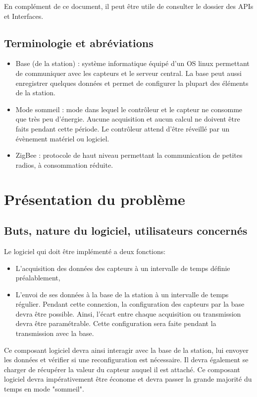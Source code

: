 En complément de ce document, il peut être utile de consulter le dossier des APIs et Interfaces.

\subsection{Terminologie et abréviations}

\begin{itemize}
\item Base (de la station) : système informatique équipé d'un OS linux permettant de communiquer avec les capteurs et le serveur central. La base peut aussi enregistrer quelques données et permet de configurer la plupart des éléments de la station.
\item Mode sommeil : mode dans lequel le contrôleur et le capteur ne consomme que très peu d'énergie. Aucune acquisition et aucun calcul ne doivent être faits pendant cette période. Le contrôleur attend d'être réveillé par un évènement matériel ou logiciel.
\item ZigBee : protocole de haut niveau permettant la communication de petites radios, à consommation réduite.
\end{itemize}

\section{Présentation du problème}

\subsection{Buts, nature du logiciel, utilisateurs concernés}

Le logiciel qui doit être implémenté a deux fonctions:
\begin{itemize}
\item L'acquisition des données des capteurs à un intervalle de temps définie préalablement,
\item L'envoi de ses données à la base de la station à un intervalle de temps régulier. Pendant cette connexion, la configuration des capteurs par la base devra être possible. Ainsi, l'écart entre chaque acquisition ou transmission devra être paramétrable. Cette configuration sera faite pendant la transmission avec la base.
\end{itemize}

Ce composant logiciel devra ainsi interagir avec la base de la station, lui envoyer les données et vérifier si une reconfiguration est nécessaire. Il devra également se charger de récupérer la valeur du capteur auquel il est attaché. Ce composant logiciel devra impérativement être économe et devra passer la grande majorité du temps en mode "sommeil".

